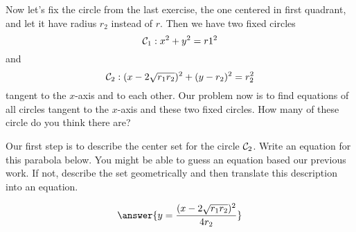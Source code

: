 \documentclass{ximera}
\begin{document}
\begin{exploration}
Now let's fix the circle from the last exercise, the one centered in first quadrant, and let it have radius $r_2$ instead of $r$. Then we have two fixed circles
\[
   {\cal C}_1: x^2 + y^2 = r1^2
\]
and
\[
  {\cal C}_2:  (x-2\sqrt{r_1r_2})^2 + (y-r_2)^2 = r_2^2
\]
tangent to the $x$-axis and to each other. Our problem now is to find equations of all circles tangent to the $x$-axis and these two fixed circles. How many of these circle do you think there are?

Our first step is to describe the center set for the circle ${\cal C}_2$. Write an equation for this parabola below. You might be able to guess an equation based our previous work. If not, describe the set geometrically and then translate this description into an equation. 
\begin{question}
\[
    \answer{y=\frac{(x-2\sqrt{r_1r_2})^2}{4r_2}}
\]
\end{question}


 
\begin{onlineOnly}
    \begin{center}
\end{center}
\end{onlineOnly}
\end{exploration}
\end{document}
